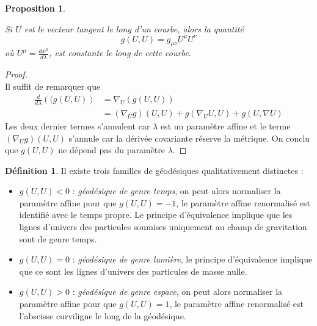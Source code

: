 \documentclass[a4paper,11pt]{report}
\theoremstyle{definition}
\theoremstyle{plain}
\newtheorem{prop}[thm]{Proposition}
\theoremstyle{definition}
\newtheorem{defn}{Définition}[chapter]
\theoremstyle{remark}
\begin{document}
            \begin{prop}\begin{leftbar}
                Si $U$ est le vecteur tangent le long d'un courbe, alors la quantité
                \begin{equation}
                    g(U,U) = g_{\mu\nu}U^\mu U^\nu
                \end{equation}
                où $U^\mu = \frac{dx^\mu}{d\lambda}$, est constante le long de cette courbe.
            \end{leftbar}\end{prop}
            
            \begin{proof}${}$\\
                Il suffit de remarquer que
                \begin{align}
                    \frac{d}{d\lambda}\left((g(U,U)\right) &= \nabla_U\left(g(U,U)\right) \\
                    &= \left(\nabla_Ug\right)(U,U) + g(\nabla_U U,U) + g(U,\nabla U) 
                \end{align}
                Les deux dernier termes s'annulent car $\lambda$ est un paramètre affine et le terme $\left(\nabla_Ug\right)(U,U)$ s'annule car la dérivée covariante réserve la métrique. On conclu que $g(U,U)$ ne dépend pas du paramètre $\lambda$.
            \end{proof}
            
            \begin{defn}
                Il existe trois familles de géodésiques qualitativement distinctes :
                \begin{itemize}[label = \textbullet]
                    \item $g(U,U)<0$ : \textit{géodésique de genre temps}, on peut alors normaliser la paramètre affine pour que $g(U,U) = -1$, le paramètre affine renormalisé est identifié avec le temps propre. Le principe d'équivalence implique que les lignes d'univers des particules soumises uniquement au champ de gravitation sont de genre temps.
                    \item $g(U,U)=0$ : \textit{géodésique de genre lumière}, le principe d'équivalence implique que ce sont les lignes d'univers des particules de masse nulle.
                    \item $g(U,U)>0$ : \textit{géodésique de genre espace}, on peut alors normaliser la paramètre affine pour que $g(U,U) = 1$, le paramètre affine renormalisé est l'abscisse curviligne le long de la géodésique.
                \end{itemize}
            \end{defn}
            
\end{document}
